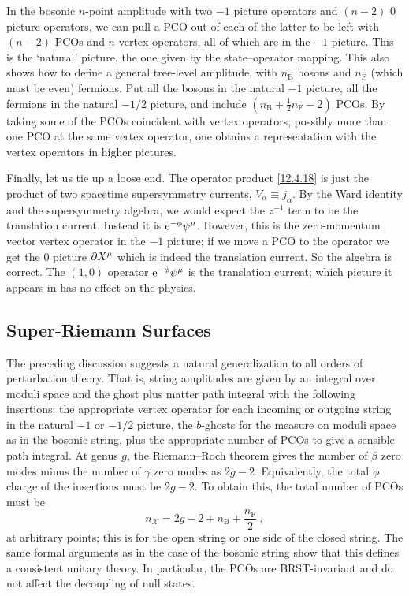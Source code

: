 In the bosonic $n$-point amplitude with two $-1$ picture operators and $(n-2)$ $0$ picture operators, we can pull a PCO out of each of the latter to be left with $(n-2)$ PCOs and $n$ vertex operators, all of which are in the $-1$ picture. This is the `natural' picture, the one given by the state--operator mapping. This also shows how to define a general tree-level amplitude, with $n_{\mathrm{B}}$ bosons and $n_{\mathrm{F}}$ (which must be even) fermions. Put all the bosons in the natural $-1$ picture, all the fermions in the natural $-1/2$ picture, and include $(n_{\mathrm{B}} + \frac{1}{2}n_{\mathrm{F}} - 2)$ PCOs. By taking some of the PCOs coincident with vertex operators, possibly more than one PCO at the same vertex operator, one obtains a representation with the vertex operators in higher pictures.

Finally, let us tie up a loose end. The operator product \eqref{12.4.18} is just the product of two spacetime supersymmetry currents, $V_{\alpha} \equiv j_{\alpha}$. By the Ward identity and the supersymmetry algebra, we would expect the $z^{-1}$ term to be the translation current. Instead it is $\mathrm{e}^{-\phi}\psi^{\mu}$. However, this is the zero-momentum vector vertex operator in the $-1$ picture; if we move a PCO to the operator we get the $0$ picture $\partial X^{\mu}$ which is indeed the translation current. So the algebra is correct. The $(1,0)$ operator $\mathrm{e}^{-\phi}\psi^{\mu}$ is the translation current; which picture it appears in has no effect on the physics.

\subsection*{Super-Riemann Surfaces}

The preceding discussion suggests a natural generalization to all orders of perturbation theory. That is, string amplitudes are given by an integral over moduli space and the ghost plus matter path integral with the following insertions: the appropriate vertex operator for each incoming or outgoing string in the natural $-1$ or $-1/2$ picture, the $b$-ghosts for the measure on moduli space as in the bosonic string, plus the appropriate number of PCOs to give a sensible path integral. At genus $g$, the Riemann--Roch theorem gives the number of $\beta$ zero modes minus the number of $\gamma$ zero modes as $2g - 2$. Equivalently, the total $\phi$ charge of the insertions must be $2g - 2$. To obtain this, the total number of PCOs must be
\begin{equation}
	n_{\mathcal{X}} = 2g - 2 + n_{\mathrm{B}} + \frac{n_{\mathrm{F}}}{2} \:, \label{12.5.14}
\end{equation}
at arbitrary points; this is for the open string or one side of the closed string. The same formal arguments as in the case of the bosonic string show that this defines a consistent unitary theory. In particular, the PCOs are BRST-invariant and do not affect the decoupling of null states.

